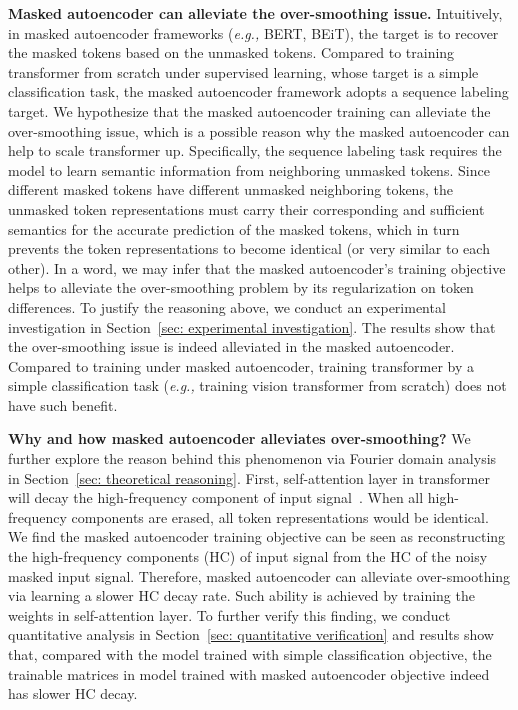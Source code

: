 \documentclass{article}
\theoremstyle{plain}
\theoremstyle{definition}
\theoremstyle{remark}
\newcommand{\eg}{\emph{e.g.,}\xspace}
\begin{document}
\textbf{Masked autoencoder can alleviate the over-smoothing issue.} Intuitively, in masked autoencoder frameworks (\eg BERT, BEiT), the target is to recover the masked tokens based on the unmasked tokens. Compared to training transformer from scratch under supervised learning, whose target is a simple classification task, the masked autoencoder framework adopts a sequence labeling target.
We hypothesize that the masked autoencoder training can alleviate the over-smoothing issue, which is a possible reason why the masked autoencoder can help to scale transformer up. Specifically, the sequence labeling task requires the model to learn semantic information from neighboring unmasked tokens. Since different masked tokens have different unmasked neighboring tokens, the unmasked token representations must carry their corresponding and sufficient semantics for the accurate prediction of the masked tokens, which in turn prevents the token representations to become identical (or very similar to each other).
In a word, we may infer that the masked autoencoder's training objective helps to alleviate the over-smoothing problem by its regularization on token differences. To justify the reasoning above, we conduct an experimental investigation in Section~\ref{sec: experimental investigation}. The results show that the over-smoothing issue is indeed alleviated in the masked autoencoder. Compared to training under masked autoencoder, training transformer by a simple classification task (\eg training vision transformer from scratch) does not have such benefit.


\textbf{Why and how masked autoencoder alleviates over-smoothing?} We further explore the reason behind this phenomenon via Fourier domain analysis in Section~\ref{sec: theoretical reasoning}. First, self-attention layer in transformer will decay the high-frequency component of input signal~\citep{wang2022anti}. When all high-frequency components are erased, all token representations would be identical. We find the masked autoencoder training objective can be seen as reconstructing the high-frequency components (HC) of input signal from the HC of the noisy masked input signal. Therefore, masked autoencoder can alleviate over-smoothing via learning a slower HC decay rate. Such ability is achieved by training the weights in self-attention layer. To further verify this finding, we conduct quantitative analysis in Section~\ref{sec: quantitative verification} and results show that, compared with the model trained with simple classification objective, the trainable matrices in model trained with masked autoencoder objective indeed has slower HC decay. 
\end{document}
